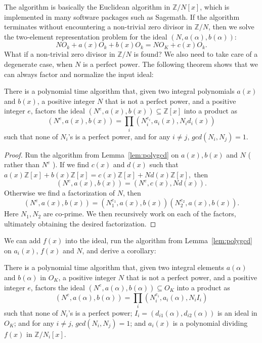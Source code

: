 \documentclass[runningheads, letter]{llncs}
\newcommand{\Z}{{\mathbb Z}}
\begin{document}
The algorithm is basically the Euclidean algorithm in
\( \Z/N[x] \), which is implemented in many software
packages such as Sagemath. If the algorithm terminates without
encountering a non-trivial zero divisor in \( \Z/N \),
then we solve the two-element
representation problem for the ideal
\( (N, a(\alpha), b(\alpha)) \):
\[ N O_k + a(x) O_k + b(x) O_k = N O_K + c(x) O_k.  \]
What if a non-trivial zero divisor in \( \Z/N \) is found?
%
We also need to take care of a degenerate case,
when \( N \) is  a perfect power.
The following theorem shows that  we can
always factor and normalize the input ideal:

\begin{theorem}
  There is a polynomial time algorithm that,
  given two integral polynomials \( a(x ) \) and
  \( b(x ) \), a positive integer \( N  \)
  that is not a perfect power, and a positive integer \( e \),
  factors the ideal \( (N^e, a(x), b(x)) \subseteq \Z[x] \)
  into a product as
  \[ (N^e, a(x), b(x)) = \prod_{i} (N_i^{e_i}, a_i(x), N_i d_i (x))  \]
  such that none of \( N_i \)'s is a perfect power,
  and for any \( i \not= j \), \( gcd(N_i, N_j) = 1\).
\end{theorem}

\begin{proof}
  Run the algorithm from Lemma~\ref{lem:polygcd}
  on \( a(x), b(x) \) and \( N \) ( rather than \( N^e \) ).
  If we find \( c(x) \) and \( d(x) \) such that
  \( a(x)\Z[x] + b(x) \Z[x] = c(x)\Z[x] + N d(x) \Z[x], \)
  then
  \[  (N^e, a(x), b(x)) = (N^e, c(x), N d(x)). \]
  Otherwise we find a factorization of \( N \), then
  \[ (N^e, a(x), b(x)) = (N_1^{e_1}, a(x), b(x))
      (N_2^{e_2}, a(x), b(x)).\] 
    Here \( N_1, N_2 \)  are co-prime.
    We then recursively work on each of the factors,
    ultimately obtaining the desired factorization.
\end{proof}

We can add \( f(x) \) into the ideal,
%
run the
algorithm from Lemma~\ref{lem:polygcd} on \( a_i(x) \),
\( f(x) \) and \( N \),
and derive a corollary:

\begin{corollary}
\label{cor:gcd}
  There is a polynomial time algorithm that,
  given two integral elements \( a(\alpha ) \) and
  \( b(\alpha) \) in \( O_K \), a positive integer \( N  \)
  that is not a perfect power, and a positive integer \( e \),
  factors
  the ideal \( (N^e, a(\alpha), b(\alpha)) \subseteq O_K \)
  into a product as
  \begin{equation}
\label{eq:5}
 (N^e, a(\alpha), b(\alpha)) =
 \prod_{i} (N_i^{e_i}, a_{ i }(\alpha),
    N_i I_i)  
  \end{equation}
  such that none of \( N_i \)'s is a perfect power;
  \( I_i = (d_{i1} (\alpha), d_{i2} (\alpha)) \)
  is an ideal in \( O_K \); and
  for any \( i \not= j \), \( gcd(N_i, N_j) = 1\);
  and \( a_{i}(x) \) is a polynomial dividing \( f(x) \)
  in \( \Z/N_i[x] \).
\end{corollary}
\end{document}
